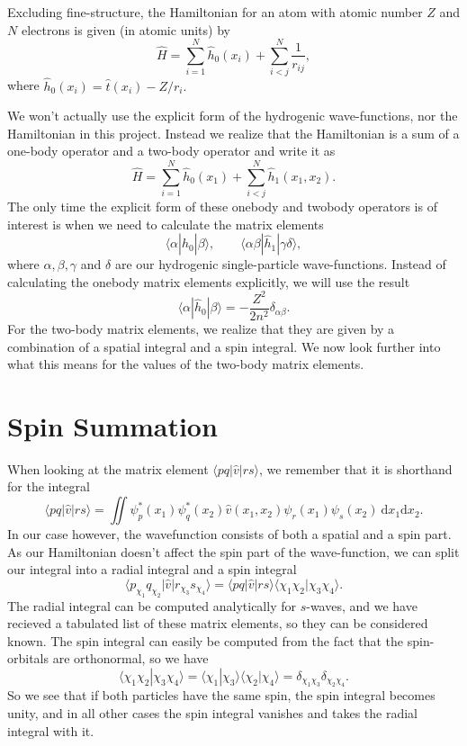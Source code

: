 \documentclass[a4paper, 11pt, notitlepage, english]{article}
\newcommand{\braket}[2]{\langle #1 | #2 \rangle}
\newcommand{\op}[1]{\hat{#1}}
\newcommand{\braopket}[3]{\langle #1 | {#2} | #3 \rangle}
\begin{document}
Excluding fine-structure, the Hamiltonian for an atom with atomic number $Z$ and $N$ electrons is given (in atomic units) by
$$\op{H} = \sum_{i=1}^N\op{h}_0(x_i) + \sum_{i<j}^N \frac{1}{r_{ij}},$$
where $\op{h}_0(x_i) = \op{t}(x_i) - Z/r_i.$

We won't actually use the explicit form of the hydrogenic wave-functions, nor the Hamiltonian in this project. Instead we realize that the Hamiltonian is a sum of a one-body operator and a two-body operator and write it as
$$\op{H} = \sum_{i=1}^N \op{h}_0(x_1) + \sum_{i<j}^N \op{h}_1(x_1,x_2).$$
The only time the explicit form of these onebody and twobody operators is of interest is when we need to calculate the matrix elements
$$\braopket{\alpha}{\op{h}_0}{\beta}, \qquad \braopket{\alpha\beta}{\op{h}_1}{\gamma\delta},$$
where $\alpha,\beta,\gamma$ and $\delta$ are our hydrogenic single-particle wave-functions. Instead of calculating the onebody matrix elements explicitly, we will use the result
$$\braopket{\alpha}{\op{h}_0}{\beta} = -\frac{Z^2}{2n^2}\delta_{\alpha\beta}.$$
For the two-body matrix elements, we realize that they are given by a combination of a spatial integral and a spin integral. We now look further into what this means for the values of the two-body matrix elements.

\section*{Spin Summation} \label{sec:spin}

When looking at the matrix element $\braopket{pq}{\op{v}}{rs}$, we remember that it is shorthand for the integral
$$\braopket{pq}{\op{v}}{rs} = \iint \psi^*_p(x_1)\psi^*_q(x_2)\op{v}(x_1,x_2)\psi_r(x_1) \psi_s(x_2) \ \mbox{d} x_1 \mbox{d} x_2.$$
In our case however, the wavefunction consists of both a spatial and a spin part. As our Hamiltonian doesn't affect the spin part of the wave-function, we can split our integral into a radial integral and a spin integral 
$$\braopket{p_{\chi_1}q_{\chi_2}}{\op{v}}{r_{\chi_3} s_{\chi_4}} = \braopket{pq}{\op{v}}{rs}\braket{\chi_1\chi_2}{\chi_3\chi_4}.$$
The radial integral can be computed analytically for $s$-waves, and we have recieved a tabulated list of these matrix elements, so they can be considered known. The spin integral can easily be computed from the fact that the spin-orbitals are orthonormal, so we have
$$\braket{\chi_1\chi_2}{\chi_3\chi_4} = \braket{\chi_1}{\chi_3}\braket{\chi_2}{\chi_4} = \delta_{\chi_1\chi_3}\delta_{\chi_2\chi_4}.$$
So we see that if both particles have the same spin, the spin integral becomes unity, and in all other cases the spin integral vanishes and takes the radial integral with it. 
\end{document}
